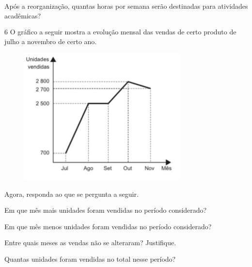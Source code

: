 Após a reorganização, quantas horas por semana serão destinadas para
atividades acadêmicas?








\num{6}  O gráfico a seguir mostra a evolução mensal das vendas de certo
produto de julho a novembro de certo ano.

\begin{figure}[H]
\centering\includegraphics[width=3.36458in,height=2.73558in]{./imgSAEB_6_MAT/media/image84.png}
\end{figure}

Agora, responda ao que se pergunta a seguir.

\begin{escolha}
\item Em que mês mais unidades foram vendidas no período considerado?\\

\item Em que mês menos unidades foram vendidas no período considerado?\\

\item Entre quais meses as vendas não se alteraram? Justifique.\\

\item Quantas unidades foram vendidas no total nesse período?\\
\end{escolha}


